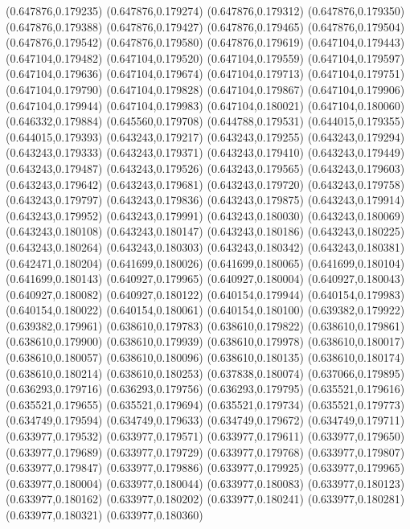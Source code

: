 (0.647876,0.179235)
(0.647876,0.179274)
(0.647876,0.179312)
(0.647876,0.179350)
(0.647876,0.179388)
(0.647876,0.179427)
(0.647876,0.179465)
(0.647876,0.179504)
(0.647876,0.179542)
(0.647876,0.179580)
(0.647876,0.179619)
(0.647104,0.179443)
(0.647104,0.179482)
(0.647104,0.179520)
(0.647104,0.179559)
(0.647104,0.179597)
(0.647104,0.179636)
(0.647104,0.179674)
(0.647104,0.179713)
(0.647104,0.179751)
(0.647104,0.179790)
(0.647104,0.179828)
(0.647104,0.179867)
(0.647104,0.179906)
(0.647104,0.179944)
(0.647104,0.179983)
(0.647104,0.180021)
(0.647104,0.180060)
(0.646332,0.179884)
(0.645560,0.179708)
(0.644788,0.179531)
(0.644015,0.179355)
(0.644015,0.179393)
(0.643243,0.179217)
(0.643243,0.179255)
(0.643243,0.179294)
(0.643243,0.179333)
(0.643243,0.179371)
(0.643243,0.179410)
(0.643243,0.179449)
(0.643243,0.179487)
(0.643243,0.179526)
(0.643243,0.179565)
(0.643243,0.179603)
(0.643243,0.179642)
(0.643243,0.179681)
(0.643243,0.179720)
(0.643243,0.179758)
(0.643243,0.179797)
(0.643243,0.179836)
(0.643243,0.179875)
(0.643243,0.179914)
(0.643243,0.179952)
(0.643243,0.179991)
(0.643243,0.180030)
(0.643243,0.180069)
(0.643243,0.180108)
(0.643243,0.180147)
(0.643243,0.180186)
(0.643243,0.180225)
(0.643243,0.180264)
(0.643243,0.180303)
(0.643243,0.180342)
(0.643243,0.180381)
(0.642471,0.180204)
(0.641699,0.180026)
(0.641699,0.180065)
(0.641699,0.180104)
(0.641699,0.180143)
(0.640927,0.179965)
(0.640927,0.180004)
(0.640927,0.180043)
(0.640927,0.180082)
(0.640927,0.180122)
(0.640154,0.179944)
(0.640154,0.179983)
(0.640154,0.180022)
(0.640154,0.180061)
(0.640154,0.180100)
(0.639382,0.179922)
(0.639382,0.179961)
(0.638610,0.179783)
(0.638610,0.179822)
(0.638610,0.179861)
(0.638610,0.179900)
(0.638610,0.179939)
(0.638610,0.179978)
(0.638610,0.180017)
(0.638610,0.180057)
(0.638610,0.180096)
(0.638610,0.180135)
(0.638610,0.180174)
(0.638610,0.180214)
(0.638610,0.180253)
(0.637838,0.180074)
(0.637066,0.179895)
(0.636293,0.179716)
(0.636293,0.179756)
(0.636293,0.179795)
(0.635521,0.179616)
(0.635521,0.179655)
(0.635521,0.179694)
(0.635521,0.179734)
(0.635521,0.179773)
(0.634749,0.179594)
(0.634749,0.179633)
(0.634749,0.179672)
(0.634749,0.179711)
(0.633977,0.179532)
(0.633977,0.179571)
(0.633977,0.179611)
(0.633977,0.179650)
(0.633977,0.179689)
(0.633977,0.179729)
(0.633977,0.179768)
(0.633977,0.179807)
(0.633977,0.179847)
(0.633977,0.179886)
(0.633977,0.179925)
(0.633977,0.179965)
(0.633977,0.180004)
(0.633977,0.180044)
(0.633977,0.180083)
(0.633977,0.180123)
(0.633977,0.180162)
(0.633977,0.180202)
(0.633977,0.180241)
(0.633977,0.180281)
(0.633977,0.180321)
(0.633977,0.180360)
